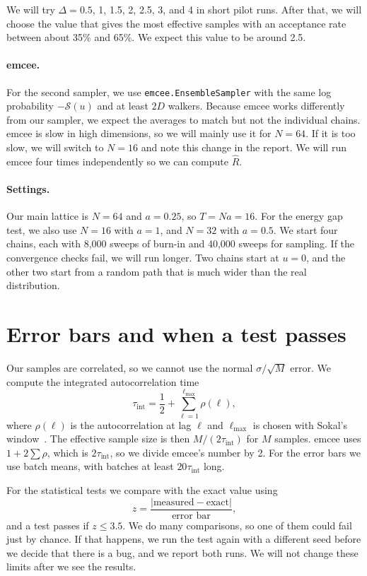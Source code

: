 \documentclass[11pt]{article}
\begin{document}
We will try $\Delta = 0.5$, 1, 1.5, 2, 2.5, 3, and 4 in short pilot runs. After that, we will choose the value that gives the most effective samples with an acceptance rate between about 35\% and 65\%. We expect this value to be around 2.5.

\paragraph{emcee.} For the second sampler, we use \texttt{emcee.EnsembleSampler} with the same log probability $-\mathcal S(u)$ and at least $2D$ walkers. Because emcee works differently from our sampler, we expect the averages to match but not the individual chains. emcee is slow in high dimensions, so we will mainly use it for $N = 64$. If it is too slow, we will switch to $N = 16$ and note this change in the report. We will run emcee four times independently so we can compute $\hat R$.

\paragraph{Settings.} Our main lattice is $N = 64$ and $a = 0.25$, so $T = Na = 16$. For the energy gap test, we also use $N = 16$ with $a = 1$, and $N = 32$ with $a = 0.5$. We start four chains, each with 8,000 sweeps of burn-in and 40,000 sweeps for sampling. If the convergence checks fail, we will run longer. Two chains start at $u = 0$, and the other two start from a random path that is much wider than the real distribution.

\section{Error bars and when a test passes}
Our samples are correlated, so we cannot use the normal $\sigma/\sqrt{M}$ error. We compute the integrated autocorrelation time
\begin{equation}
  \tau_{\text{int}} = \frac12 + \sum_{\ell=1}^{\ell_{\max}} \rho(\ell),
\end{equation}
where $\rho(\ell)$ is the autocorrelation at lag $\ell$ and $\ell_{\max}$ is chosen with Sokal's window~\cite{sokal}. The effective sample size is then $M/(2\tau_{\text{int}})$ for $M$ samples. emcee uses $1 + 2\sum\rho$, which is $2\tau_{\text{int}}$, so we divide emcee's number by 2. For the error bars we use batch means, with batches at least $20\tau_{\text{int}}$ long.

For the statistical tests we compare with the exact value using
\begin{equation}
  z = \frac{|\text{measured} - \text{exact}|}{\text{error bar}},
\end{equation}
and a test passes if $z \le 3.5$. We do many comparisons, so one of them could fail just by chance. If that happens, we run the test again with a different seed before we decide that there is a bug, and we report both runs. We will not change these limits after we see the results.
\end{document}
